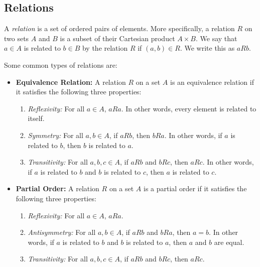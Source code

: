 \subsection{Relations}

A \textit{relation} is a set of ordered pairs of elements. More specifically, a relation $R$ on two sets $A$ and $B$ is a subset of their Cartesian product $A \times B$. We say that $a \in A$ is related to $b \in B$ by the relation $R$ if $(a, b) \in R$. We write this as $aRb$.

Some common types of relations are:

\begin{itemize} 

\item \textbf{Equivalence Relation:} A relation $R$ on a set $A$ is an equivalence relation if it satisfies the following three properties: 

\begin{enumerate} 

    \item \textit{Reflexivity:} For all $a \in A$, $aRa$. In other words, every element is related to itself. 
    
    \item \textit{Symmetry:} For all $a, b \in A$, if $aRb$, then $bRa$. In other words, if $a$ is related to $b$, then $b$ is related to $a$. 
    
    \item \textit{Transitivity:} For all $a, b, c \in A$, if $aRb$ and $bRc$, then $aRc$. In other words, if $a$ is related to $b$ and $b$ is related to $c$, then $a$ is related to $c$. 
\end{enumerate}


\item \textbf{Partial Order:} A relation $R$ on a set $A$ is a partial order if it satisfies the following three properties: 
    \begin{enumerate} 
        
        \item \textit{Reflexivity:} For all $a \in A$, $aRa$. 
        
        \item \textit{Antisymmetry:} For all $a, b \in A$, if $aRb$ and $bRa$, then $a = b$. In other words, if $a$ is related to $b$ and $b$ is related to $a$, then $a$ and $b$ are equal. 
        
        \item \textit{Transitivity:} For all $a, b, c \in A$, if $aRb$ and $bRc$, then $aRc$. 
        \end{enumerate} 

    \end{itemize}

